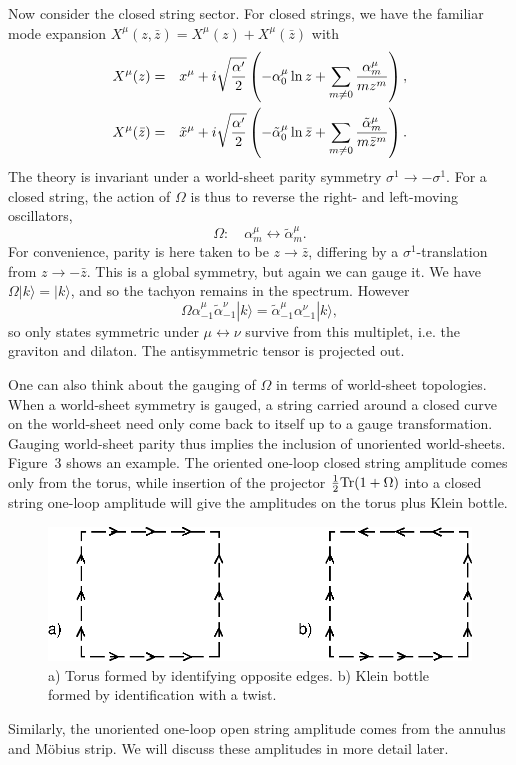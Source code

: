 \documentclass[12pt]{article}
\def\be{\begin{equation}}
\def\ee{\end{equation}}
\def\bea{\begin{eqnarray}}
\def\eea{\end{eqnarray}}
\def\ap{\alpha'}
\def\Tr{{\rm Tr}}
\newcommand{\zb}{{\bar{z}}}
\begin{document}
Now consider the closed string sector. For closed strings, we have the 
familiar mode expansion 
$X^\mu(z,\zb)=X^\mu(z)+X^\mu(\zb)$ with
\bea
X^\mu(z)&=&x^\mu+i\sqrt{\ap\over2}
\left(-\alpha_0^\mu
\ln z+\sum_{m\neq0}{\alpha^\mu_m\over mz^m}\right), \nonumber\\
X^\mu(\zb)&=&{\tilde x}^\mu+i\sqrt{\ap\over2}\left(-{\tilde\alpha}_0^\mu
\ln \zb+\sum_{m\neq0}{{\tilde\alpha}^\mu_m\over m\zb^m}\right).
\label{cmodes}
\eea
The theory is invariant under a  world-sheet parity symmetry
$\sigma^1\to-\sigma^1$.
For a closed string, the action of $\Omega$ is thus to reverse the right- and
left-moving oscillators,
\be
\Omega\colon\quad\alpha^\mu_m\leftrightarrow{\tilde\alpha}^\mu_m.
\ee
For convenience, parity is here taken to be $z \to \bar z$, differing by a
$\sigma^1$-translation from $z \to -\bar z$.  This is a global symmetry,
but again we can gauge it.  We have
${\Omega|{ k}\rangle=|{ k}\rangle}$, and so the tachyon remains in the
spectrum.  However
\be
\Omega\alpha^\mu_{-1}{\tilde\alpha}^\nu_{-1}|{
k}\rangle= {\tilde\alpha}^\mu_{-1}\alpha^\nu_{-1}|{ k}\rangle,
\ee
so only states symmetric under $\mu\leftrightarrow\nu$ survive from this
multiplet, i.e. the graviton and dilaton.  The antisymmetric tensor is
projected out.

One can also think about the gauging of $\Omega$ in terms of world-sheet
topologies.  When a world-sheet symmetry is gauged, 
a string carried around a closed curve on the world-sheet need only come
back to itself up to a gauge transformation.  Gauging world-sheet parity
thus implies the inclusion of unoriented world-sheets.
Figure~3 shows an example.  The oriented one-loop closed string amplitude
comes only from the torus, while insertion of the projector
${1\over2}\Tr(1+\Omega)$ into a closed string one-loop
amplitude will give the amplitudes on the torus plus Klein bottle.
\begin{figure}
\begin{center}
\leavevmode
\includegraphics{torklein.eps}
\end{center}
\caption[]{a) Torus formed by identifying opposite edges.  b) Klein bottle
formed by identification with a twist.}
\end{figure}
Similarly, the unoriented one-loop open string amplitude comes from the 
annulus and M\"obius strip.  We will discuss these amplitudes in
more detail later.
\end{document}
